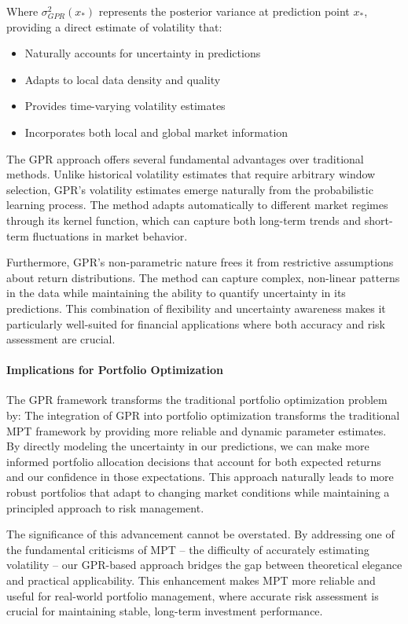 Where $\sigma_{GPR}^2(x_*)$ represents the posterior variance at prediction point $x_*$, providing a direct estimate of volatility that:

\begin{itemize}
    \item Naturally accounts for uncertainty in predictions
    \item Adapts to local data density and quality
    \item Provides time-varying volatility estimates
    \item Incorporates both local and global market information
\end{itemize}

The GPR approach offers several fundamental advantages over traditional methods. Unlike historical volatility estimates that require arbitrary window selection, GPR's volatility estimates emerge naturally from the probabilistic learning process. The method adapts automatically to different market regimes through its kernel function, which can capture both long-term trends and short-term fluctuations in market behavior.

Furthermore, GPR's non-parametric nature frees it from restrictive assumptions about return distributions. The method can capture complex, non-linear patterns in the data while maintaining the ability to quantify uncertainty in its predictions. This combination of flexibility and uncertainty awareness makes it particularly well-suited for financial applications where both accuracy and risk assessment are crucial.


\paragraph{Implications for Portfolio Optimization}
The GPR framework transforms the traditional portfolio optimization problem by:
The integration of GPR into portfolio optimization transforms the traditional MPT framework by providing more reliable and dynamic parameter estimates. By directly modeling the uncertainty in our predictions, we can make more informed portfolio allocation decisions that account for both expected returns and our confidence in those expectations. This approach naturally leads to more robust portfolios that adapt to changing market conditions while maintaining a principled approach to risk management.

The significance of this advancement cannot be overstated. By addressing one of the fundamental criticisms of MPT – the difficulty of accurately estimating volatility – our GPR-based approach bridges the gap between theoretical elegance and practical applicability. This enhancement makes MPT more reliable and useful for real-world portfolio management, where accurate risk assessment is crucial for maintaining stable, long-term investment performance.



